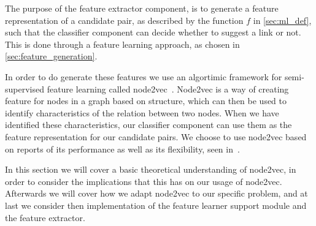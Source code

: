 The purpose of the feature extractor component, is to generate a feature representation of a candidate pair, as described by the function $f$ in \cref{sec:ml_def}, such that the classifier component can decide whether to suggest a link or not. This is done through a feature learning approach, as chosen in \cref{sec:feature_generation}.




In order to do generate these features we use an algortimic framework for semi-supervised feature learning called node2vec~\cite{node2vec}. Node2vec is a way of creating feature for nodes in a graph based on structure, which can then be used to identify characteristics of the relation between two nodes. When we have identified these characteristics, our classifier component can use them as the feature representation for our candidate pairs. We choose to use node2vec based on reports of its performance as well as its flexibility, seen in~\cite{node2vec}.

In this section we will cover a basic theoretical understanding of node2vec, in order to consider the implications that this has on our usage of node2vec. Afterwards we will cover how we adapt node2vec to our specific problem, and at last we consider then implementation of the feature learner support module and the feature extractor.


